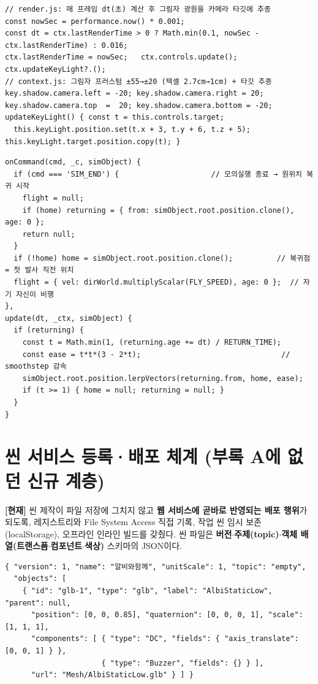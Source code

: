 \begin{verbatim}
// render.js: 매 프레임 dt(초) 계산 후 그림자 광원을 카메라 타깃에 추종
const nowSec = performance.now() * 0.001;
const dt = ctx.lastRenderTime > 0 ? Math.min(0.1, nowSec - ctx.lastRenderTime) : 0.016;
ctx.lastRenderTime = nowSec;   ctx.controls.update();   ctx.updateKeyLight?.();
// context.js: 그림자 프러스텀 ±55→±20 (텍셀 2.7cm→1cm) + 타깃 추종
key.shadow.camera.left = -20; key.shadow.camera.right = 20;
key.shadow.camera.top  =  20; key.shadow.camera.bottom = -20;
updateKeyLight() { const t = this.controls.target;
  this.keyLight.position.set(t.x + 3, t.y + 6, t.z + 5); this.keyLight.target.position.copy(t); }
\end{verbatim}

\begin{verbatim}
onCommand(cmd, _c, simObject) {
  if (cmd === 'SIM_END') {                     // 모의실행 종료 → 원위치 복귀 시작
    flight = null;
    if (home) returning = { from: simObject.root.position.clone(), age: 0 };
    return null;
  }
  if (!home) home = simObject.root.position.clone();          // 복귀점 = 첫 발사 직전 위치
  flight = { vel: dirWorld.multiplyScalar(FLY_SPEED), age: 0 };  // 자기 자신이 비행
},
update(dt, _ctx, simObject) {
  if (returning) {
    const t = Math.min(1, (returning.age += dt) / RETURN_TIME);
    const ease = t*t*(3 - 2*t);                                // smoothstep 감속
    simObject.root.position.lerpVectors(returning.from, home, ease);
    if (t >= 1) { home = null; returning = null; }
  }
}
\end{verbatim}

\section{씬 서비스 등록·배포 체계 (부록 A에 없던 신규 계층)}
\textbf{[현재]} 씬 제작이 파일 저장에 그치지 않고 \textbf{웹 서비스에 곧바로 반영되는 배포
행위}가 되도록,  레지스트리와 File System Access 직접 기록,
작업 씬 임시 보존(localStorage), 오프라인  인라인 빌드를 갖췄다. 씬 파일은
\textbf{버전$\cdot$주제(topic)$\cdot$객체 배열(트랜스폼$\cdot$컴포넌트$\cdot$색상)} 스키마의 JSON이다.

\begin{verbatim}
{ "version": 1, "name": "알비와함께", "unitScale": 1, "topic": "empty",
  "objects": [
    { "id": "glb-1", "type": "glb", "label": "AlbiStaticLow", "parent": null,
      "position": [0, 0, 0.85], "quaternion": [0, 0, 0, 1], "scale": [1, 1, 1],
      "components": [ { "type": "DC", "fields": { "axis_translate": [0, 0, 1] } },
                      { "type": "Buzzer", "fields": {} } ],
      "url": "Mesh/AlbiStaticLow.glb" } ] }
\end{verbatim}

